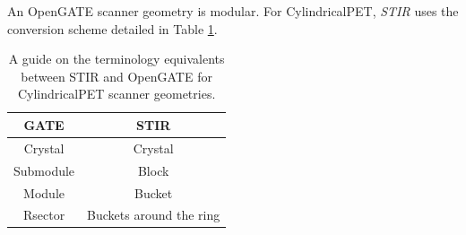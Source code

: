 \documentclass{article}
\begin{document}
An OpenGATE scanner geometry is modular. For CylindricalPET, \textit{STIR} uses the conversion
scheme detailed in Table \ref{tab:STIR-OpenGATE_terminology}.

\begin{table}[h]
    \centering
        \begin{tabular}{ |c | c| }
            \hline
            \textbf{GATE} & \textbf{STIR}  \\ 
            \hline
            Crystal & Crystal  \\
            Submodule & Block  \\
            Module & Bucket  \\
            Rsector & Buckets around the ring  \\
            \hline
        \end{tabular}
    \caption{A guide on the terminology equivalents between STIR and OpenGATE for CylindricalPET
    scanner geometries.}
    \label{tab:STIR-OpenGATE_terminology}
\end{table}
\end{document}
